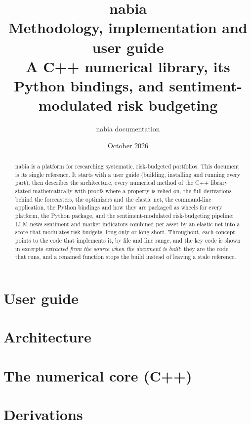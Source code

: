 \documentclass[11pt,a4paper,oneside]{report}
\title{nabia\\[0.4em]\Large Methodology, implementation and user guide\\[0.3em]
\large A C++ numerical library, its Python bindings, and sentiment-modulated risk budgeting}
\author{nabia documentation}
\date{October 2026}
\begin{document}
\maketitle

\begin{abstract}
nabia is a platform for researching systematic, risk-budgeted portfolios. This document is its single
reference. It starts with a user guide (building, installing and running every part), then describes the
architecture, every numerical method of the C++ library stated mathematically with proofs where a property
is relied on, the full derivations behind the forecasters, the optimizers and the elastic net, the command-line
application, the Python bindings and how they are packaged as wheels for every platform, the Python package,
and the sentiment-modulated risk-budgeting pipeline: LLM news sentiment and market indicators combined per asset
by an elastic net into a score that modulates risk budgets, long-only or long-short. Throughout, each concept
points to the code that implements it, by file and line range, and the key code is shown in excerpts
\emph{extracted from the source when the document is built}: they are the code that runs, and a renamed
function stops the build instead of leaving a stale reference.
\end{abstract}

\tableofcontents

\part{User guide}\label{part:guide}


\part{Architecture}\label{part:architecture}


\part{The numerical core (C++)}\label{part:core}


\part{Derivations}\label{part:derivations}





\end{document}
